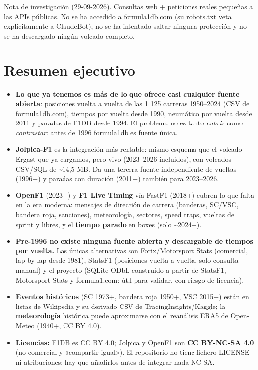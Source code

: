 \begin{nota}
Nota de investigación (29-09-2026). Consultas web + peticiones reales pequeñas a las APIs públicas. No se ha accedido a formula1db.com (su robots.txt veta explícitamente a ClaudeBot), no se ha intentado saltar ninguna protección y no se ha descargado ningún volcado completo.
\end{nota}

\section{Resumen ejecutivo}

\begin{itemize}
\item \textbf{Lo que ya tenemos es más de lo que ofrece casi cualquier fuente abierta}: posiciones vuelta a vuelta de las 1 125 carreras 1950–2024 (CSV de formula1db.com), tiempos por vuelta desde 1990, neumático por vuelta desde 2011 y paradas de F1DB desde 1994. El problema no es tanto \emph{cubrir} como \emph{contrastar}: antes de 1996 formula1db es fuente única.
\item \textbf{Jolpica-F1} es la integración más rentable: mismo esquema que el volcado Ergast que ya cargamos, pero vivo (2023–2026 incluidos), con volcados CSV/SQL de \textasciitilde{}14,5 MB. Da una tercera fuente independiente de vueltas (1996+) y paradas con duración (2011+) también para 2023–2026.
\item \textbf{OpenF1} (2023+) y \textbf{F1 Live Timing} vía FastF1 (2018+) cubren lo que falta en la era moderna: mensajes de dirección de carrera (banderas, SC/VSC, bandera roja, sanciones), meteorología, sectores, speed traps, vueltas de sprint y libres, y el \textbf{tiempo parado} en boxes (solo \textasciitilde{}2024+).
\item \textbf{Pre-1996 no existe ninguna fuente abierta y descargable de tiempos por vuelta.} Las únicas alternativas son Forix/Motorsport Stats (comercial, lap-by-lap desde 1981), StatsF1 (posiciones vuelta a vuelta, solo consulta manual) y el proyecto  (SQLite ODbL construido a partir de StatsF1, Motorsport Stats y formula1.com: útil para validar, con riesgo de licencia).
\item \textbf{Eventos históricos} (SC 1973+, bandera roja 1950+, VSC 2015+) están en listas de Wikipedia y su derivado CSV de TracingInsights/Kaggle; la \textbf{meteorología} histórica puede aproximarse con el reanálisis ERA5 de Open-Meteo (1940+, CC BY 4.0).
\item \textbf{Licencias:} F1DB es CC BY 4.0; Jolpica y OpenF1 son \textbf{CC BY-NC-SA 4.0} (no comercial y «compartir igual»). El repositorio no tiene fichero LICENSE ni atribuciones: hay que añadirlos antes de integrar nada NC-SA.
\end{itemize}

